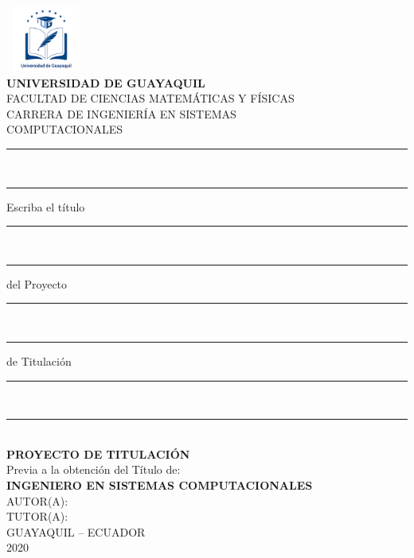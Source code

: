 \documentclass[12pt, a4paper, nofontenc, numbers=endperiod]{apa7}
\begin{document}
	
	\thispagestyle{empty}
	{ %
		\begin{center}		
			\includegraphics[width=2.65cm,height=2.17cm]{Imagenes/Figura1}	\\
			\textbf{\Large UNIVERSIDAD DE GUAYAQUIL} \\ [0.5cm]
			{\large FACULTAD DE CIENCIAS MATEMÁTICAS Y FÍSICAS}\\
			{\large CARRERA DE INGENIERÍA EN SISTEMAS \\  COMPUTACIONALES } \\ [0.5cm]
			{\large
				\rule[1mm]{90mm}{0.1mm} \\
				\rule[1mm]{20mm}{0.1mm}  Escriba el título \rule[1mm]{20mm}{0.1mm}\\
				\rule[1mm]{15mm}{0.1mm}  del Proyecto \rule[1mm]{15mm}{0.1mm}\\
				\rule[1mm]{7mm}{0.1mm}  de Titulación \rule[1mm]{7mm}{0.1mm}\\
				\rule[1mm]{20mm}{0.1mm}} \\ [0.5cm]
			{\textbf{\large PROYECTO DE TITULACIÓN}} \\ [0.5cm]
			{\large Previa a la obtención del Título de:} \\ [0.5cm]
			{\textbf{\large  INGENIERO EN SISTEMAS COMPUTACIONALES}} \\ [0.5cm]
			{\large  AUTOR(A):} \\ [0.5cm]
			{\large  TUTOR(A):} \\ [0.5cm]
			{\large  GUAYAQUIL – ECUADOR\\
				2020
			}
		\end{center}
	}
	\newpage
	\thispagestyle{empty}
\end{document}

